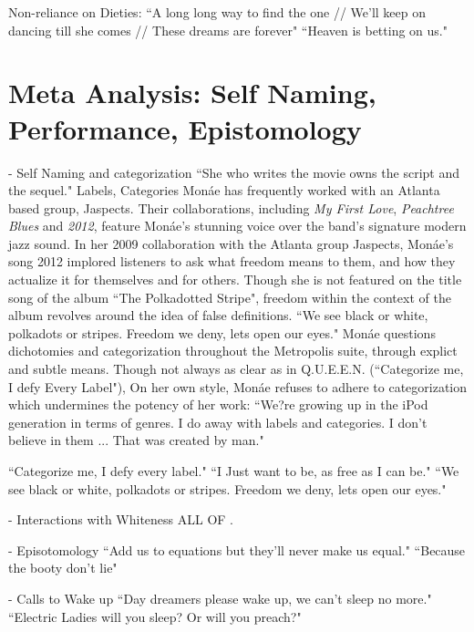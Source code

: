 \documentclass[a4paper, 11pt]{article} %
\begin{document}
Non-reliance on Dieties:
``A long long way to find the one // We'll keep on dancing till she comes // These dreams are forever"\cite{danceordie}
``Heaven is betting on us."\cite{primetime}


\section*{Meta Analysis: Self Naming, Performance, Epistomology}

- Self Naming and categorization
``She who writes the movie owns the script and the sequel."\cite{queen}
Labels, Categories
Mon\'ae has frequently worked with an Atlanta based group, Jaspects.
Their collaborations, including \emph{My First Love}, \emph{Peachtree Blues} and \emph{2012}, feature Mon\'ae's stunning voice over the band's signature modern jazz sound\cite{peachtreeblues}\cite{mytruelove}.
In her 2009 collaboration with the Atlanta group Jaspects, Mon\'ae's song 2012 implored listeners to ask what freedom means to them, and how they actualize it for themselves and for others.
Though she is not featured on the title song of the album ``The Polkadotted Stripe", freedom within the context of the album revolves around the idea of false definitions.
``We see black or white, polkadots or stripes. Freedom we deny, lets open our eyes."\cite{polkadottedstripe}
Mon\'ae questions dichotomies and categorization throughout the Metropolis suite, through explict and subtle means.
Though not always as clear as in Q.U.E.E.N. (``Categorize me, I defy Every Label"\cite{queen}), 
On her own style, Mon\'ae refuses to adhere to categorization which undermines the potency of her work:
``We?re growing up in the iPod generation in terms of genres. I do away with labels and categories. I don't believe in them ... That was created by man."\cite{joeyguerra2010}


``Categorize me, I defy every label."\cite{queen}
``I Just want to be, as free as I can be."\cite{polkadottedstripe}
``We see black or white, polkadots or stripes. Freedom we deny, lets open our eyes."\cite{polkadottedstripe}

- Interactions with Whiteness
ALL OF \cite{favoritefugitive}.

- Episotomology
``Add us to equations but they'll never make us equal."\cite{queen}
``Because the booty don't lie"\cite{queen}


- Calls to Wake up
``Day dreamers please wake up, we can't sleep no more."\cite{sincerelyjane}
``Electric Ladies will you sleep? Or will you preach?"\cite{queen}
\end{document}
